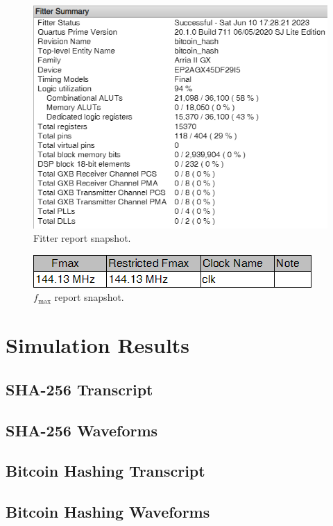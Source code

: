 \documentclass{article}
\begin{document}
\begin{figure}[H]
  \centering
    \centering
    \includegraphics[width=0.6\linewidth]{fitter.png}
  \caption{Fitter report snapshot.}
\end{figure}

\begin{figure}[H]
  \centering
    \centering
    \includegraphics[width=0.6\linewidth]{fmax.png}
  \caption{$f_\text{max}$ report snapshot.}
\end{figure}


\newpage
\section{Simulation Results}

\subsection{SHA-256 Transcript}




\subsection{SHA-256 Waveforms}

\newpage
\subsection{Bitcoin Hashing Transcript}


\subsection{Bitcoin Hashing Waveforms}

\label{LastPage}
\end{document}
